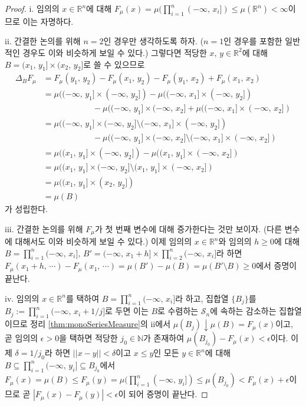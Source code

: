 \begin{proof}
    i. 임의의 $x\in\mathbb{R}^n$에 대해 $F_\mu(x)=\mu(\prod_{i=1}^n(-\infty,\,x_i])\leq\mu(\mathbb{R}^n)<\infty$이므로 이는 자명하다.

    ii. 간결한 논의를 위해 $n=2$인 경우만 생각하도록 하자. ($n=1$인 경우를 포함한 일반적인 경우도 이와 비슷하게 보일 수 있다.) 그렇다면 적당한 $x,\,y\in\mathbb{R}^2$에 대해 $B=(x_1,\,y_1]\times(x_2,\,y_2]$로 쓸 수 있으므로
    \begin{align*}
        \Delta_BF_\mu&=F_\mu(y_1,\,y_2)-F_\mu(x_1,\,y_2)-F_\mu(y_1,\,x_2)+F_\mu(x_1,\,x_2)\\
        &=\mu((-\infty,\,y_1]\times(-\infty,\,y_2])-\mu((-\infty,\,x_1]\times(-\infty,\,y_2])\\
        &\qquad\qquad\qquad-\mu((-\infty,\,y_1]\times(-\infty,\,x_2]+\mu((-\infty,\,x_1]\times(-\infty,\,x_2])\\
        &=\mu((-\infty,\,y_1]\times(-\infty,\,y_2]\setminus(-\infty,\,x_1]\times(-\infty,\,y_2])\\
        &\qquad\qquad\qquad-\mu((-\infty,\,y_1]\times(-\infty,\,x_2]\setminus(-\infty,\,x_1]\times(-\infty,\,x_2])\\
        &=\mu((x_1,\,y_1]\times(-\infty,\,y_2])-\mu((x_1,\,y_1]\times(-\infty,\,x_2])\\
        &=\mu((x_1,\,y_1]\times(-\infty,\,y_2]\setminus(x_1,\,y_1]\times(-\infty,\,x_2])\\
        &=\mu((x_1,\,y_1]\times(x_2,\,y_2])\\
        &=\mu(B)
    \end{align*}
    가 성립한다.

    iii. 간결한 논의를 위해 $F_\mu$가 첫 번째 변수에 대해 증가한다는 것만 보이자. (다른 변수에 대해서도 이와 비슷하게 보일 수 있다.) 이제 임의의 $x\in\mathbb{R}^n$와 임의의 $h\geq0$에 대해 $B=\prod_{i=1}^n(-\infty,\,x_i],\,B'=(-\infty,\,x_1+h]\times\prod_{i=2}^{n}(-\infty,\,x_i]$라 하면 $F_\mu(x_1+h,\,\cdots)-F_\mu(x_1,\,\cdots)=\mu(B')-\mu(B)=\mu(B'\setminus B)\geq0$에서 증명이 끝난다.

    iv. 임의의 $x\in\mathbb{R}^n$를 택하여 $B=\prod_{i=1}^n(-\infty,\,x_i]$라 하고, 집합열 $\{B_j\}$를 $B_j:=\prod_{i=1}^n(-\infty,\,x_i+1/j]$로 두면 이는 $B$로 수렴하는 $\mathcal{S}_n$에 속하는 감소하는 집합열이므로 정리 \ref{thm:monoSeriesMeasure}의 ii에서 $\mu(B_j)\downarrow\mu(B)=F_\mu(x)$이고, 곧 임의의 $\epsilon>0$을 택하면 적당한 $j_0\in\mathbb{N}$가 존재하여 $\mu(B_{j_0})-F_\mu(x)<\epsilon$이다.  이제 $\delta=1/j_0$라 하면 $||x-y||<\delta$이고 $x\leq y$인 모든 $y\in\mathbb{R}^n$에 대해 $B\subseteq\prod_{i=1}^n(-\infty,\,y_i]\subseteq B_{j_0}$에서 $F_\mu(x)=\mu(B)\leq F_\mu(y)=\mu(\prod_{i=1}^n(-\infty,\,y_i])\leq\mu(B_{j_0})<F_\mu(x)+\epsilon$이므로 곧 $|F_\mu(x)-F_\mu(y)|<\epsilon$이 되어 증명이 끝난다.


\end{proof}
